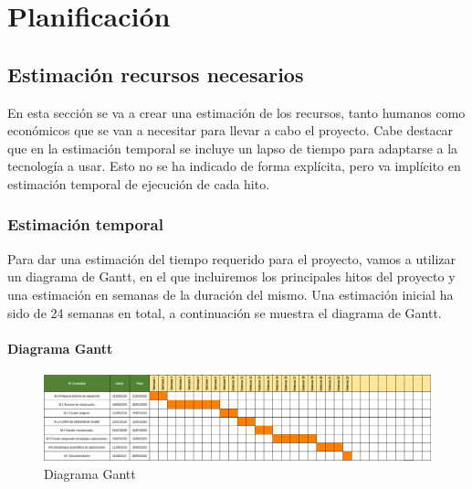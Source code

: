 \chapter {Planificación}

\section{Estimación recursos necesarios}
\begin{text}
        En esta sección se va a crear una estimación de los recursos, tanto humanos como económicos que se van a necesitar para llevar a cabo el proyecto. Cabe destacar que en la estimación temporal se incluye un lapso de tiempo para adaptarse a la tecnología a usar. Esto no se ha indicado de forma explícita, pero va implícito en estimación temporal de ejecución de cada hito. \\ 

\end{text}
\subsection{Estimación temporal}
\begin{text}
        Para dar una estimación del tiempo requerido para el proyecto, vamos a utilizar un diagrama de Gantt, en el que incluiremos los principales hitos del proyecto y una estimación en semanas de la duración del mismo. Una estimación inicial ha sido de 24 semanas en total, a continuación se muestra el diagrama de Gantt.
\end{text}

\newpage
\subsubsection{Diagrama Gantt}
        \begin{figure}[!hbt]
                \centering
                \includegraphics[scale=0.4,angle=-90]{imagenes/Planificacion/gannt2.png}
                \caption[Diagrama Gantt]{Diagrama Gantt \cite{Gantt:online}} 
                \label{Diagrama Gannt}
        \end{figure}
\clearpage

